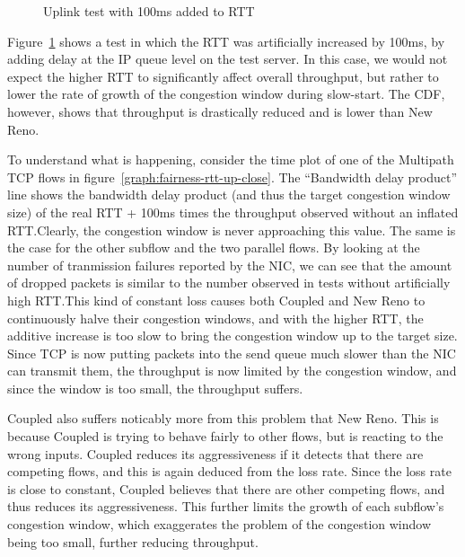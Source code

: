 \begin{figure}[h]
 \centering
 \subfloat[][CDF] {\
   \scalebox{0.55}{}\label{graph:fairness-rtt-up-cdf}
 }
 \subfloat[][Multipath TCP time plot] {\
   \scalebox{0.55}{}\label{graph:fairness-rtt-up-close}
 }
 \caption{Uplink test with 100ms added to RTT}\label{graph:fairness-rtt-up}
\end{figure}

Figure~\ref{graph:fairness-rtt-up} shows a test in which the RTT was
artificially increased by 100ms, by adding delay at the IP queue level on the
test server. In this case, we would not expect the higher RTT to significantly
affect overall throughput, but rather to lower the rate of growth of the
congestion window during slow-start. The CDF, however, shows that throughput is
drastically reduced and is lower than New Reno.

To understand what is happening, consider the time plot of one of the Multipath
TCP flows in figure~\ref{graph:fairness-rtt-up-close}. The ``Bandwidth delay
product'' line shows the bandwidth delay product (and thus the target congestion
window size) of the real RTT + 100ms times the throughput observed without an
inflated RTT.\@ Clearly, the congestion window is never approaching this value.
The same is the case for the other subflow and the two parallel flows. By
looking at the number of tranmission failures reported by the NIC, we can see
that the amount of dropped packets is similar to the number observed in tests
without artificially high RTT.\@ This kind of constant loss causes both Coupled
and New Reno to continuously halve their congestion windows, and with the higher
RTT, the additive increase is too slow to bring the congestion window up to the
target size. Since TCP is now putting packets into the send queue much slower
than the NIC can transmit them, the throughput is now limited by the congestion
window, and since the window is too small, the throughput suffers.

Coupled also suffers noticably more from this problem that New Reno. This is
because Coupled is trying to behave fairly to other flows, but is reacting to
the wrong inputs.  Coupled reduces its aggressiveness if it detects that there
are competing flows, and this is again deduced from the loss rate. Since the
loss rate is close to constant, Coupled believes that there are other competing
flows, and thus reduces its aggressiveness. This further limits the growth of
each subflow's congestion window, which exaggerates the problem of the
congestion window being too small, further reducing throughput.

